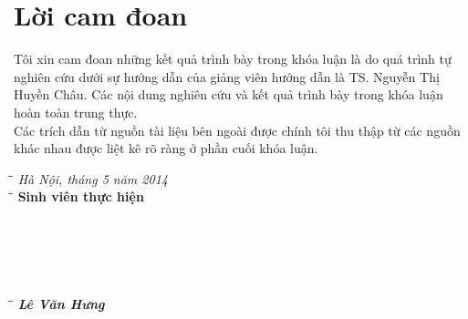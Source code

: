 \chapter*{Lời cam đoan}
Tôi xin cam đoan những kết quả trình bày trong khóa luận là do quá trình tự nghiên cứu dưới sự hướng dẫn của giảng viên hướng dẫn là TS. Nguyễn Thị Huyền Châu.
Các nội dung nghiên cứu và kết quả trình bày trong khóa luận hoàn toàn trung thực.\\

Các trích dẫn từ nguồn tài liệu bên ngoài được chính tôi thu thập từ các nguồn khác nhau được liệt kê rõ ràng ở phần cuối khóa luận.

\vspace{3 cm}
\begin{tabbing}
\hspace{3in} \= \= \kill
\> \textit{Hà Nội, tháng 5 năm 2014}\\
\hspace{3.4in} \= \= \kill
\> \textbf{Sinh viên thực hiện}\\\\\\\\\\\\
\hspace{3.5in} \= \= \kill
\> \textbf{\textit{Lê Văn Hưng}}
\end{tabbing}	